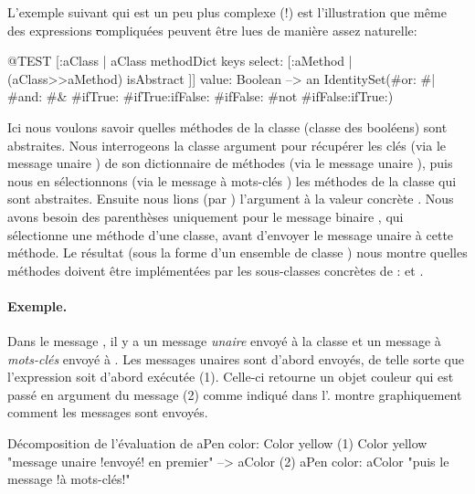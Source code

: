 \documentclass[a4paper,10pt,twoside]{book}
\begin{document}
L'exemple suivant qui est un peu plus complexe (!) est l'illustration que même des expressions \st compliquées peuvent être lues de manière assez naturelle: 
\begin{code}{@TEST}
[:aClass | aClass methodDict keys select: [:aMethod | (aClass>>aMethod) isAbstract ]] value: Boolean --> an IdentitySet(#or: #| #and: #& #ifTrue: #ifTrue:ifFalse: #ifFalse: #not #ifFalse:ifTrue:)
\end{code}
\noindent
Ici nous voulons savoir quelles méthodes de la classe 
(classe des booléens) sont abstraites.
Nous interrogeons la classe argument  pour récupérer
les clés (via le message unaire ) de son dictionnaire de
méthodes (via le message unaire ), puis nous en
sélectionnons (via le message à mots-clés ) les
méthodes de la classe qui sont abstraites.
Ensuite nous lions (par ) l'argument  à la
valeur concrète .
Nous avons besoin des parenthèses uniquement pour le message binaire
\ct{>>}, qui sélectionne une méthode d'une classe, avant d'envoyer
le message unaire \mbox{} à cette méthode. Le
résultat (sous la forme d'un ensemble de classe )
nous montre quelles méthodes doivent être implémentées par les
sous-classes concrètes de :  et .


\paragraph{Exemple.}
Dans le message , il y a un message \emph{unaire}  
envoyé à la classe  et un message à \emph{mots-clés}  envoyé à . 
Les messages unaires sont d'abord envoyés, de telle sorte que l'expression  
soit d'abord exécutée (1). Celle-ci retourne un objet couleur qui est passé en argument du 
message  (2) comme indiqué dans l'.
 montre graphiquement comment les messages sont envoyés.

\begin{example}[decColor]{Décomposition de l'évaluation de }{}
        aPen color: Color yellow
(1)                       Color yellow        "message unaire !envoyé! en premier"
                        --> aColor
(2)   aPen color: aColor                 "puis le message !à mots-clés!"
\end{example}
\end{document}
